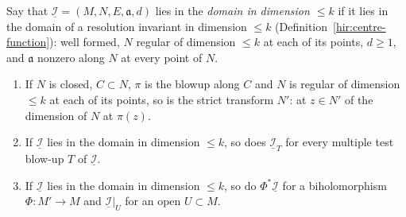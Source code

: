 \begin{proposition}
\label{bcalc:inv-domain-stable}
\leanok
Say that \(\underline{\mathcal I}=(M,N,E,\mathfrak a,d)\) lies in the \emph{domain in dimension \(\le k\)} if it lies in the domain of a resolution invariant in dimension \(\le k\)
(Definition~\ref{hir:centre-function}): well formed, \(N\) regular of dimension \(\le k\) at each of its points, \(d\ge1\), and \(\mathfrak a\) nonzero along \(N\) at every point
of \(N\).
\begin{enumerate}
\item If \(N\) is closed, \(C\subset N\), \(\pi\) is the blowup along \(C\) and \(N\) is regular of dimension \(\le k\) at each of its points, so is the strict transform \(N'\): at
\(z\in N'\) of the dimension of \(N\) at \(\pi(z)\).
\item If \(\underline{\mathcal I}\) lies in the domain in dimension \(\le k\), so does \(\underline{\mathcal I}_T\) for every multiple test blow-up \(T\) of \(\underline{\mathcal I}\).
\item If \(\underline{\mathcal I}\) lies in the domain in dimension \(\le k\), so do \(\Phi^*\underline{\mathcal I}\) for a biholomorphism \(\Phi\colon M'\to M\) and
\(\underline{\mathcal I}|_U\) for an open \(U\subset M\).
\end{enumerate}
\end{proposition}
